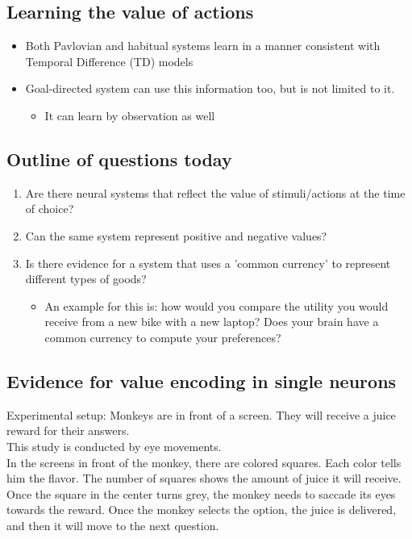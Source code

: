 \subsection{Learning the value of actions}
\begin{itemize}
    \item Both Pavlovian and habitual systems learn in a manner consistent with Temporal Difference (TD) models
    \item Goal-directed system can use this information too, but is not limited to it.
    \begin{itemize}
        \item It can learn by observation as well
    \end{itemize}
\end{itemize}

\subsection{Outline of questions today}
\begin{enumerate}
    \item Are there neural systems that reflect the value of stimuli/actions at the time of choice?
    \item Can the same system represent positive and negative values?
    \item Is there evidence for a system that uses a 'common currency' to represent different types of goods?
    \begin{itemize}
        \item An example for this is: how would you compare the utility you would receive from a new bike with a new laptop? Does your brain have a common currency to compute your preferences?
    \end{itemize}
\end{enumerate}

\subsection{Evidence for value encoding in single neurons}
Experimental setup:
Monkeys are in front of a screen. They will receive a juice reward for their answers.
\\This study is conducted by eye movements.
\\In the screens in front of the monkey, there are colored squares. Each color tells him the flavor. The number of squares 
shows the amount of juice it will receive.
\\Once the square in the center turns grey, the monkey needs to saccade its eyes towards the reward. Once the monkey selects the option, the juice is delivered, and then it will move to the next question.

